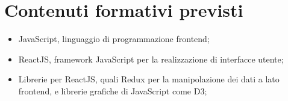 \section*{Contenuti formativi previsti}
\begin{itemize}
  \item JavaScript, linguaggio di programmazione frontend;
  \item ReactJS, framework JavaScript per la realizzazione di interfacce utente;
  \item Librerie per ReactJS, quali Redux per la manipolazione dei dati a lato frontend, e librerie grafiche di JavaScript come D3;
\end{itemize}
\newpage
